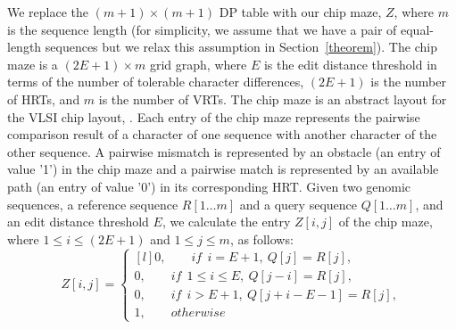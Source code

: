 \noindent {} 
We replace the $(m+1) \times (m+1)$ DP table with our chip maze, $Z$, where $m$ is the sequence length (for simplicity, we assume that we have a pair of equal-length sequences but we relax this assumption in {Section}~\ref{theorem}). 
The chip maze is a $(2E+1) \times m$ grid graph, where $E$ is the edit distance threshold {in terms of {the number of} tolerable character differences}, $(2E+1)$ is the number of HRTs, and $m$ is the number of VRTs. 
The chip maze is an abstract layout for the VLSI chip layout, . 
Each entry of the chip maze represents the pairwise comparison result of a character of one sequence with another character of the other sequence. 
A pairwise mismatch is represented by an obstacle (an entry of value '1') in the chip maze and a pairwise match is represented by an available path (an entry of value '0') in its corresponding HRT.
Given two genomic sequences, a reference sequence $R[1\dots m]$ and a query sequence $Q[1\dots m]$, and an edit distance threshold $E$, we calculate the entry $Z[i, j]$ of the chip maze, where $1\leq i\leq (2E+1)$ and $1\leq j\leq m$, as follows:\newline
\begin{equation}
\label{equ:chipmaze}
Z[i,j]=\left\{\begin{matrix*}[l]
0,\quad\quad if~~i=E+1, ~Q[j]=R[j],  \\ 
0,\quad\quad if~~1\leq i\leq E, ~Q[j-i]=R[j],  \\ 
0,\quad\quad if~~i> E+1, ~Q[j+i-E-1]=R[j],  \\ 
1,\quad\quad otherwise 
\end{matrix*}\right.
\end{equation}

